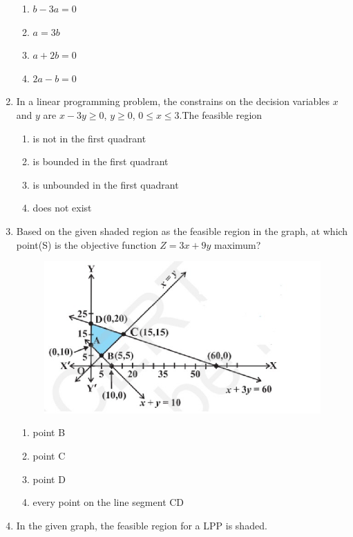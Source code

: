 \documentclass{article}
\begin{document}
\begin{enumerate}
\begin{enumerate}
    \item $b-3a=0$
    \item $a=3b$
    \item $a+2b=0$
    \item $2a-b=0$
\end{enumerate}
\item In a linear programming problem, the constrains on the decision variables $x$ and $y$ are $x-3y \geq 0$, $y \geq 0$, $0\leq x \leq 3$.The feasible region 
\begin{enumerate}
    \item is not in the first quadrant
    \item is bounded in the first quadrant 
    \item is unbounded in the first quadrant 
    \item does not exist  
\end{enumerate}
\item Based on the given shaded region as the feasible region in the graph, at which point(S) is the objective function $Z=3x+9y$ maximum?\\
\begin{figure}[h]
    \centering{}
    \includegraphics[width=\columnwidth]{Figs/Fig1.jpg}
    \caption{}
    \label{Fig1}
\end{figure}
\begin{enumerate}
    \item point B
    \item point C
    \item point D
    \item every point on the line segment CD   
\end{enumerate}
\item In the given graph, the feasible region for a LPP is shaded.\\

\end{enumerate}
\end{document}
